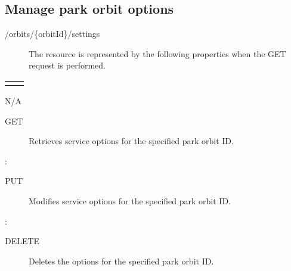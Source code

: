 \documentclass[letterpaper,10pt,english]{sphinxmanual}
\begin{document}
\subsection{Manage park orbit options}
\label{\detokenize{restapi:manage-park-orbit-options}}
 /orbits/\{orbitId\}/settings
\begin{description}
\item[{}] \leavevmode
The resource is represented by the following properties when the GET request is performed.

\end{description}


\begin{savenotes}\sphinxattablestart
\centering
\begin{tabulary}{\linewidth}[t]{|T|T|}
\hline

&
\\
\hline&\\
\hline
\end{tabulary}
\par
\sphinxattableend\end{savenotes}

 N/A
\begin{description}
\item[{ GET}] \leavevmode
Retrieves service options for the specified park orbit ID.

\end{description}

:

\begin{sphinxVerbatim}[commandchars=\\\{\}]
\end{sphinxVerbatim}
\begin{description}
\item[{ PUT}] \leavevmode
Modifies service options for the specified park orbit ID.

\end{description}

:

\begin{sphinxVerbatim}[commandchars=\\\{\}]
\end{sphinxVerbatim}
\begin{description}
\item[{ DELETE}] \leavevmode
Deletes the options for the specified park orbit ID.

\end{description}
\end{document}
